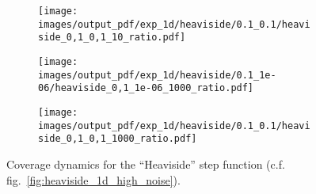 \documentclass[a4paper,14pt]{extarticle}
\begin{document}
\begin{figure}
\begin{subfigure}[b]{0.25\linewidth}
    \caption{} \label{fig:heaviside_1d_high_noise_arb_c1}
  \end{subfigure}%
  \begin{subfigure}[b]{0.25\linewidth}
    \texttt{[image: images/output\_pdf/exp\_1d/heaviside/0.1\_0.1/heaviside\_0,1\_0,1\_10\_ratio.pdf]}
    \caption{} \label{fig:heaviside_1d_high_noise_arb_c2}
  \end{subfigure}%
  \begin{subfigure}[b]{0.25\linewidth}
    \texttt{[image: images/output\_pdf/exp\_1d/heaviside/0.1\_1e-06/heaviside\_0,1\_1e-06\_1000\_ratio.pdf]}
    \caption{} \label{fig:heaviside_1d_high_noise_arb_c3}
  \end{subfigure}%
  \begin{subfigure}[b]{0.25\linewidth}
    \texttt{[image: images/output\_pdf/exp\_1d/heaviside/0.1\_0.1/heaviside\_0,1\_0,1\_1000\_ratio.pdf]}
    \caption{} \label{fig:heaviside_1d_high_noise_arb_c4}
  \end{subfigure}%
  \caption{Coverage dynamics for the ``Heaviside'' step function (c.f. fig.~\ref{fig:heaviside_1d_high_noise}).}
  \label{fig:heaviside_1d_high_noise_arb}
\end{figure}
\end{document}
